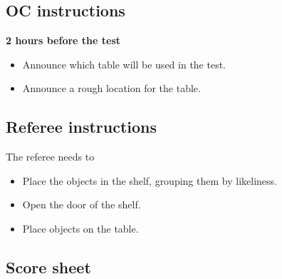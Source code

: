 \newpage
\subsection{OC instructions}

\textbf{2 hours before the test}
\begin{itemize}
	\item Announce which table will be used in the test.
	\item Announce a rough location for the table.
\end{itemize}

\subsection{Referee instructions}
The referee needs to
\begin{itemize}
	\item Place the objects in the shelf, grouping them by likeliness.
	\item Open the door of the shelf.
	\item Place objects on the table.
\end{itemize}


\newpage
\subsection{Score sheet}


